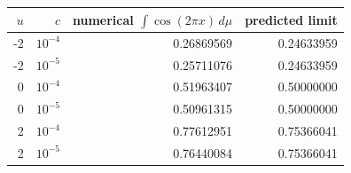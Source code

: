 \begin{tabular}{@{}rrrr@{}}
\toprule
$u$ & $c$ & numerical $\int\cos(2\pi x)\,d\mu$ & predicted limit\\
\midrule
-2 & $10^{-4}$ & 0.26869569 & 0.24633959\\
-2 & $10^{-5}$ & 0.25711076 & 0.24633959\\
0 & $10^{-4}$ & 0.51963407 & 0.50000000\\
0 & $10^{-5}$ & 0.50961315 & 0.50000000\\
2 & $10^{-4}$ & 0.77612951 & 0.75366041\\
2 & $10^{-5}$ & 0.76440084 & 0.75366041\\
\bottomrule
\end{tabular}
